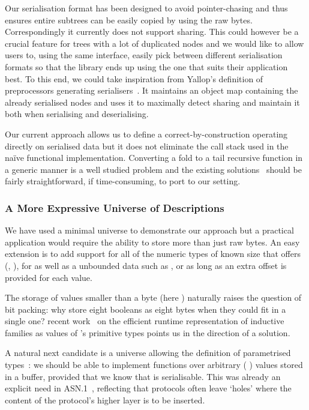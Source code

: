 Our serialisation format has been designed to avoid pointer-chasing and
thus ensures entire subtrees can be easily copied by using the raw bytes.
Correspondingly it currently does not support sharing.
%
This could however be a crucial feature for trees with a lot of duplicated
nodes and we would like to allow users to, using the same interface,
easily pick between different serialisation formats so that the library
ends up using the one that suits their application best.
%
To this end, we could take inspiration from Yallop's
definition of preprocessors generating serialisers~\cite{DBLP:conf/ml/Yallop07}.
It maintains an object map containing the already serialised nodes and uses it
to maximally detect sharing and maintain it both when serialising and deserialising.


Our current approach allows us to define a correct-by-construction
 operating directly on serialised data but it
does not eliminate the call stack used in the naïve functional
implementation.
%
Converting a fold to a tail recursive function in a generic manner
is a well studied problem and the existing
solutions~\cite{DBLP:conf/popl/McBride08,DBLP:conf/icfp/CortinasS18}
should be fairly straightforward, if time-consuming, to port to our setting.

\subsubsection{A More Expressive Universe of Descriptions}

We have used a minimal universe to demonstrate our approach but a practical
application would require the ability to store more than just raw bytes.
An easy extension is to add support for all of the numeric types of
known size that \idris{} offers
(, ),
for 
as well as a unbounded data such as , or 
as long as an extra offset is provided for each value.

The storage of values smaller than a byte (here ) naturally
raises the question of bit packing: why store eight booleans as eight bytes
when they could fit in a single one?
%
\iftoggle{BLIND}{Allais'}{Our} recent work~\cite{DBLP:conf/esop/Allais23}
on the efficient runtime representation of inductive families as values
of \idris{}'s primitive types points us in the direction of a solution.

A natural next candidate is a universe allowing the definition of parametrised
types~\cite{DBLP:conf/icfp/LohM11}: we should be able to implement functions over arbitrary
( ) values stored in a buffer,
provided that we know that  is serialisable.
%
This was already an explicit need in ASN.1~\cite{MANUAL:book/larmouth1999},
reflecting that protocols often leave `holes' where the content of
the protocol's higher layer is to be inserted.

